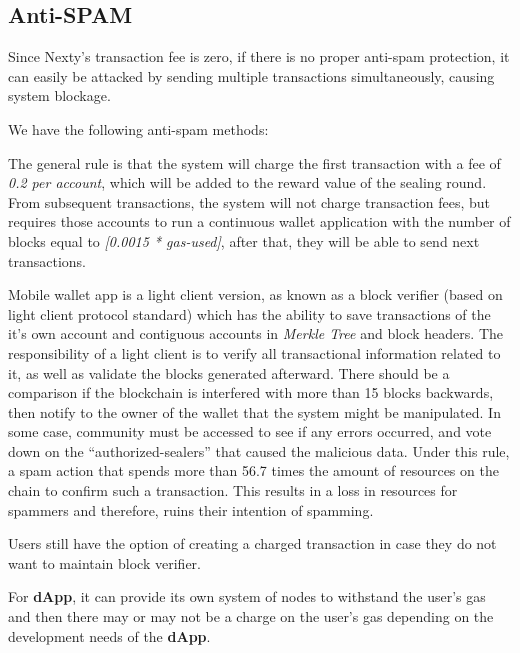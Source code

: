 \documentclass[12pt,oneside]{amsart}
\begin{document}
\begin{multicols}{2}
\section{Anti-SPAM}\label{sec:spam}

Since Nexty's transaction fee is zero, if there is no proper anti-spam protection, it can easily be attacked by sending multiple transactions simultaneously, causing system blockage.

We have the following anti-spam methods:

The general rule is that the system will charge the first transaction with a fee of \textit{0.2 per account}, which will be added to the reward value of the sealing round. From subsequent transactions, the system will not charge transaction fees, but requires those accounts to run a continuous wallet application with the number of blocks equal to \textit{[0.0015 * gas-used]}, after that, they will be able to send next transactions.

Mobile wallet app is a light client version, as known as a block verifier (based on light client protocol standard) which has the ability to save transactions of the it's own account and contiguous accounts in \textit{Merkle Tree} and block headers. The responsibility of a light client is to verify all transactional information related to it, as well as validate the blocks generated afterward. There should be a comparison if the blockchain is interfered with more than 15 blocks backwards, then notify to the owner of the wallet that the system might be manipulated. In some case, community must be accessed to see if any errors occurred, and vote down on the ``authorized-sealers'' that caused the malicious data. Under this rule, a spam action that spends more than 56.7 times the amount of resources on the chain to confirm such a transaction. This results in a loss in resources for spammers and therefore, ruins their intention of spamming.

Users still have the option of creating a charged transaction in case they do not want to maintain block verifier.

For \textbf{{\small {dApp}}}, it can provide its own system of nodes to withstand the user's gas and then there may or may not be a charge on the user's gas depending on the development needs of the \textbf{{\small {dApp}}}.




\end{multicols}
\end{document}
